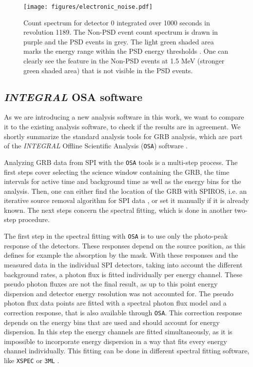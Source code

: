 \documentclass[twocolumn,traditabstract]{aa}
\begin{document}
\begin{figure}[ht]
    \begin{centering}
        \texttt{[image: figures/electronic\_noise.pdf]}
        \caption{Count spectrum for detector 0 integrated over 1000 seconds in revolution 1189. The Non-PSD event count spectrum is drawn in purple and the PSD events in grey. The light green shaded area marks the energy range within the PSD energy thresholds \citep{spi_electronic_noise}. One can clearly see the feature in the Non-PSD events at 1.5 MeV (stronger green shaded area) that is not visible in the PSD events.}
        \label{fig:electronic}
    \end{centering}
\end{figure}

\subsection{\textit{INTEGRAL} OSA software}
\label{OSA}

As we are introducing a new analysis software in this work, we want to compare it to the existing analysis software, to check if the results are in agreement. We shortly summarize the standard analysis tools for GRB analysis, which are part of the \textit{INTEGRAL} Offline Scientific Analysis ({\tt OSA}) software \citep{osa}.

Analyzing GRB data from SPI with the {\tt OSA} tools is a multi-step process. The first steps cover selecting the science window containing the GRB, the time intervals for active time and background time as well as the energy bins for the analysis. Then, one can either find the location of the GRB with SPIROS, i.e. an iterative source removal algorithm for SPI data \citep{Skinner-2003}, or set it manually if it is already known. The next steps concern the spectral fitting, which is done in another two-step procedure.

The first step in the spectral fitting with {\tt OSA} is to use only the photo-peak response of the detectors. These responses depend on the source position, as this defines for example the absorption by the mask. With these responses and the measured data in the individual SPI detectors, taking into account the different background rates, a photon flux is fitted individually per energy channel. These pseudo photon fluxes are not the final result, as up to this point energy dispersion and detector energy resolution was not accounted for.
The pseudo photon flux data points are fitted with a spectral photon flux model and a correction response, that is also available through {\tt OSA}. This correction response depends on the energy bins that are used and should account for energy dispersion. In this step the energy channels are fitted simultaneously, as it is impossible to incorporate energy dispersion in a way that fits every energy channel individually. This fitting can be done in different spectral fitting software, like {\tt XSPEC} \citep{xspec} or {\tt 3ML} \citep{3ML}.
\end{document}

